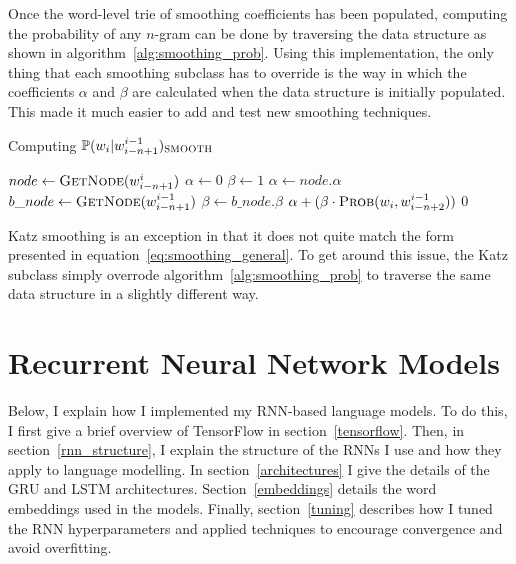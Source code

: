 \documentclass[a4paper, 12pt]{report}
\begin{document}
Once the word-level trie of smoothing coefficients has been populated, computing the probability of any $n$-gram can be done by traversing the data structure as shown in algorithm~\ref{alg:smoothing_prob}. Using this implementation, the only thing that each smoothing subclass has to override is the way in which the coefficients $\alpha$ and $\beta$ are calculated when the data structure is initially populated. This made it much easier to add and test new smoothing techniques.

\begin{algorithm}
\caption{Computing $\mathbb{P}(w_i | w_{i - n + 1}^{i - 1})_{\text{\scshape SMOOTH}}$}
\label{alg:smoothing_prob}
\begin{algorithmic}[1]
	\State $node \gets \text{\scshape GetNode}(w_{i - n + 1}^i)$
	\State $\alpha \gets 0$
	\State $\beta \gets 1$
		\State $\alpha \gets node.\alpha$
	\EndIf
		\State $b\_node \gets \text{\scshape GetNode}(w_{i - n + 1}^{i - 1})$
			\State $\beta \gets b\_node.\beta$
		\EndIf
	\EndIf
	\State \Return $\alpha + (\beta \cdot \text{\scshape Prob}(w_i, w_{i - n + 2}^{i - 1}))$
\EndIf
\State \Return $0$
\EndProcedure
\end{algorithmic}
\end{algorithm}

Katz smoothing is an exception in that it does not quite match the form presented in equation~\ref{eq:smoothing_general}. To get around this issue, the Katz subclass simply overrode algorithm~\ref{alg:smoothing_prob} to traverse the same data structure in a slightly different way.

\section{Recurrent Neural Network Models} \label{rnn_lm}

Below, I explain how I implemented my RNN-based language models. To do this, I first give a brief overview of TensorFlow in section~\ref{tensorflow}. Then, in section~\ref{rnn_structure}, I explain the structure of the RNNs I use and how they apply to language modelling. In section~\ref{architectures} I give the details of the GRU and LSTM architectures. Section~\ref{embeddings} details the word embeddings used in the models. Finally, section~\ref{tuning} describes how I tuned the RNN hyperparameters and applied techniques to encourage convergence and avoid overfitting.
\end{document}
